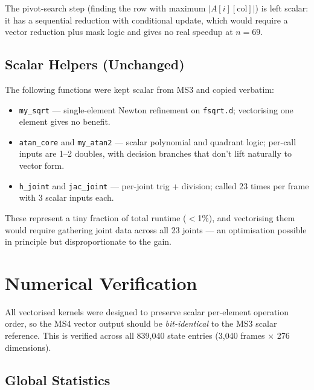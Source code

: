 \documentclass[11pt,a4paper]{article}
\begin{document}
The pivot-search step (finding the row with maximum $|A[i][\mathrm{col}]|$)
is left scalar: it has a sequential reduction with conditional update,
which would require a vector reduction plus mask logic and gives no real
speedup at $n=69$.

\subsection{Scalar Helpers (Unchanged)}

The following functions were kept scalar from MS3 and copied verbatim:

\begin{itemize}
    \item \texttt{my\_sqrt} --- single-element Newton refinement on
          \texttt{fsqrt.d}; vectorising one element gives no benefit.
    \item \texttt{atan\_core} and \texttt{my\_atan2} --- scalar polynomial
          and quadrant logic; per-call inputs are 1--2 doubles, with
          decision branches that don't lift naturally to vector form.
    \item \texttt{h\_joint} and \texttt{jac\_joint} --- per-joint trig +
          division; called 23 times per frame with 3 scalar inputs each.
\end{itemize}

These represent a tiny fraction of total runtime ($<$1\%), and vectorising
them would require gathering joint data across all 23 joints --- an
optimisation possible in principle but disproportionate to the gain.

\section{Numerical Verification}

All vectorised kernels were designed to preserve scalar per-element
operation order, so the MS4 vector output should be \emph{bit-identical}
to the MS3 scalar reference. This is verified across all 839{,}040 state
entries (3{,}040 frames $\times$ 276 dimensions).

\subsection{Global Statistics}
\end{document}
